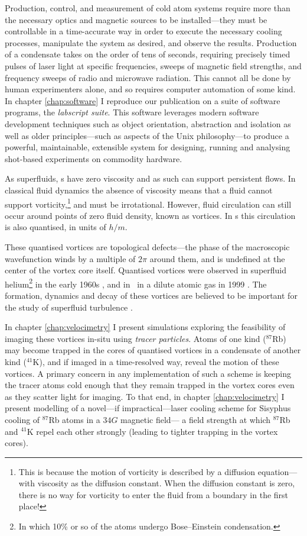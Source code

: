 Production, control, and measurement of cold atom systems require more than the necessary optics and magnetic sources to be installed---they must be controllable in a time-accurate way in order to execute the necessary cooling processes, manipulate the system as desired, and observe the results. Production of a condensate takes on the order of tens of seconds, requiring precisely timed pulses of laser light at specific frequencies, sweeps of magnetic field strengths, and frequency sweeps of radio and microwave radiation. This cannot all be done by human experimenters alone, and so requires computer automation of some kind. In chapter \ref{chap:software} I reproduce our publication on a suite of software programs, the \emph{labscript suite}. This software leverages modern software development techniques such as object orientation, abstraction and isolation as well as older principles---such as aspects of the Unix philosophy---to produce a powerful, maintainable, extensible system for designing, running and analysing shot-based experiments on commodity hardware.

As superfluids, \bec s have zero viscosity and as such can support persistent flows. In classical fluid dynamics the absence of viscosity means that a fluid cannot support vorticity,\footnote{This is because the motion of vorticity is described by a diffusion equation---with viscosity as the diffusion constant. When the diffusion constant is zero, there is no way for vorticity to enter the fluid from a boundary in the first place!} and must be irrotational. However, fluid circulation can still occur around points of zero fluid density, known as vortices. In \bec s this circulation is also quantised, in units of $h/m$.

These quantised vortices are topological defects---the phase of the macroscopic wavefunction winds by a multiple of $2\pi$ around them, and is undefined at the center of the vortex core itself.  Quantised vortices were observed in superfluid helium\footnote{In which 10\% or so of the atoms undergo Bose--Einstein condensation.} in the early 1960s \cite{vinen_detection_1961}, and in \bec\ in a dilute atomic gas in 1999 \cite{matthews_vortices_1999}. The formation, dynamics and decay of these vortices are believed to be important for the study of superfluid turbulence \cite{barenghi_quantized_2001}.

In chapter \ref{chap:velocimetry} I present simulations exploring the feasibility of imaging these vortices in-situ using \emph{tracer particles}. Atoms of one kind ($^{87}$Rb) may become trapped in the cores of quantised vortices in a condensate of another kind ($^{41}$K), and if imaged in a time-resolved way, reveal the motion of these vortices. A primary concern in any implementation of such a scheme is keeping the tracer atoms cold enough that they remain trapped in the vortex cores even as they scatter light for imaging. To that end, in chapter \ref{chap:velocimetry} I present modelling of a novel---if impractical---laser cooling scheme for Sisyphus cooling of $^{87}$Rb atoms in a $34\unit{G}$ magnetic field--- a field strength at which $^{87}$Rb and $^{41}$K repel each other strongly (leading to tighter trapping in the vortex cores).

